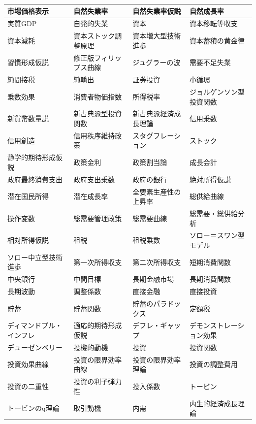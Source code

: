 \documentclass[xelatex,a4paper,base=11pt,ja=standard,jafont=noto]{bxjsreport}
\begin{document}
\begin{table}[H]
\centering
\small
\begin{tabular}{|>{\raggedright\arraybackslash}p{3.5cm}|>{\raggedright\arraybackslash}p{3.5cm}|>{\raggedright\arraybackslash}p{3.5cm}|>{\raggedright\arraybackslash}p{3.5cm}|}
\hline
市場価格表示 & 自然失業率 & 自然失業率仮説 & 自然成長率 \\
\hline
実質GDP & 自発的失業 & 資本 & 資本移転等収支 \\
\hline
資本減耗 & 資本ストック調整原理 & 資本増大型技術進歩 & 資本蓄積の黄金律 \\
\hline
習慣形成仮説 & 修正版フィリップス曲線 & ジュグラーの波 & 需要不足失業 \\
\hline
純間接税 & 純輸出 & 証券投資 & 小循環 \\
\hline
乗数効果 & 消費者物価指数 & 所得税率 & ジョルゲンソン型投資関数 \\
\hline
新貨幣数量説 & 新古典派型投資関数 & 新古典派経済成長理論 & 信用乗数 \\
\hline
信用創造 & 信用秩序維持政策 & スタグフレーション & ストック \\
\hline
静学的期待形成仮説 & 政策金利 & 政策割当論 & 成長会計 \\
\hline
政府最終消費支出 & 政府支出乗数 & 政府の銀行 & 絶対所得仮説 \\
\hline
潜在国民所得 & 潜在成長率 & 全要素生産性の上昇率 & 総供給曲線 \\
\hline
操作変数 & 総需要管理政策 & 総需要曲線 & 総需要・総供給分析 \\
\hline
相対所得仮説 & 租税 & 租税乗数 & ソロー＝スワン型モデル \\
\hline
ソロー中立型技術進歩 & 第一次所得収支 & 第二次所得収支 & 短期消費関数 \\
\hline
中央銀行 & 中間目標 & 長期金融市場 & 長期消費関数 \\
\hline
長期波動 & 調整係数 & 直接金融 & 直接投資 \\
\hline
貯蓄 & 貯蓄関数 & 貯蓄のパラドックス & 定額税 \\
\hline
ディマンドプル・インフレ & 適応的期待形成仮説 & デフレ・ギャップ & デモンストレーション効果 \\
\hline
デューゼンベリー & 投機的動機 & 投資 & 投資関数 \\
\hline
投資効果曲線 & 投資の限界効率曲線 & 投資の限界効率理論 & 投資の調整費用 \\
\hline
投資の二重性 & 投資の利子弾力性 & 投入係数 & トービン \\
\hline
トービンのq理論 & 取引動機 & 内需 & 内生的経済成長理論 \\

\end{tabular}
\end{table}
\end{document}
